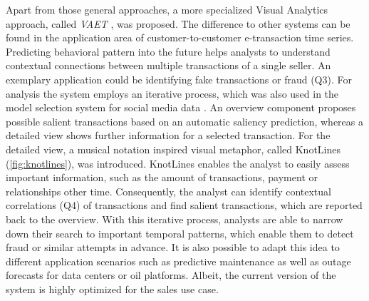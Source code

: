 \documentclass[electronic]{vgtc}             %
\begin{document}
Apart from those general approaches, a more specialized Visual Analytics approach, called \textit{VAET} \cite{Xie:2014}, was proposed.
The difference to other systems can be found in the application area of customer-to-customer e-transaction time series.
Predicting behavioral pattern into the future helps analysts to understand contextual connections between multiple transactions of a single seller.
An exemplary application could be identifying fake transactions or fraud (Q3).
For analysis the system employs an iterative process, which was also used in the model selection system for social media data \cite{koepp:2014}.
An overview component proposes possible salient transactions based on an automatic saliency prediction, whereas a detailed view shows further information for a selected transaction.
For the detailed view, a musical notation inspired visual metaphor, called KnotLines (\autoref{fig:knotlines}), was introduced.
KnotLines enables the analyst to easily assess important information, such as the amount of transactions, payment or relationships other time. 
Consequently, the analyst can identify contextual correlations (Q4) of transactions and find salient transactions, which are reported back to the overview. 
With this iterative process, analysts are able to narrow down their search to important temporal patterns, which enable them to detect fraud or similar attempts in advance. 
It is also possible to adapt this idea to different application scenarios such as predictive maintenance as well as outage forecasts for data centers or oil platforms.
Albeit, the current version of the system is highly optimized for the sales use case. 
\end{document}
